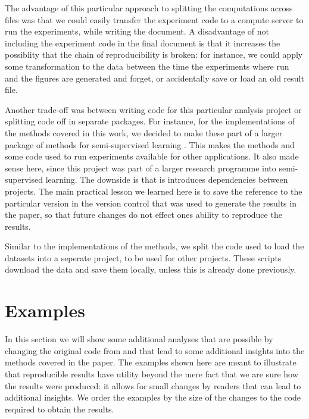 \documentclass[runningheads,a4paper]{llncs}\usepackage[]{graphicx}\usepackage[]{color}
\begin{document}
The advantage of this particular approach to splitting the computations across files was that we could easily transfer the experiment code to a compute server to run the experiments, while writing the document. A disadvantage of not including the experiment code in the final document is that it increases the possiblity that the chain of reproducibility is broken: for instance, we could apply some transformation to the data between the time the experiments where run and the figures are generated and forget, or accidentally save or load an old result file.

Another trade-off was between writing code for this particular analysis project or splitting code off in separate packages. For instance, for the implementations of the methods covered in this work, we decided to make these part of a larger package of methods for semi-supervised learning \cite{RSSL}. This makes the methods and some code used to run experiments available for other applications. It also made sense here, since this project was part of a larger research programme into semi-supervised learning. The downside is that is introduces dependencies between projects. The main practical lesson we learned here is to save the reference to the particular version in the version control that was used to generate the results in the paper, so that future changes do not effect ones ability to reproduce the results.

Similar to the implementations of the methods, we split the code used to load the datasets into a seperate project, to be used for other projects. These scripts download the data and save them locally, unless this is already done previously.

\section{Examples}
\label{section:exampleperformance}
In this section we will show some additional analyses that are possible by changing the original code from \cite{Krijthe2016a} and that lead to some additional insights into the methods covered in the paper. The examples shown here are meant to illustrate that reproducible results have utility beyond the mere fact that we are sure how the results were produced: it allows for small changes by readers that can lead to additional insights. We order the examples by the size of the changes to the code required to obtain the results.
\end{document}

